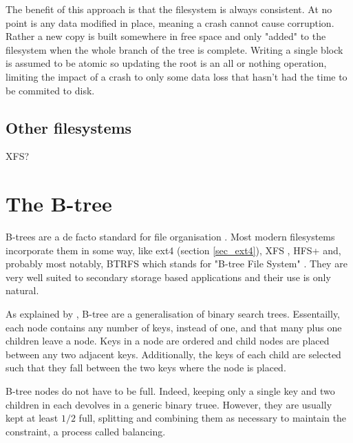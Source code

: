            The benefit of this approach is that the filesystem is always
            consistent. At no point is any data modified in place, meaning a
            crash cannot cause corruption. Rather a new copy is built somewhere
            in free space and only "added" to the filesystem when the whole
            branch of the tree is complete. Writing a single block is assumed
            to be atomic \cite{drive_atomicity} so updating the root is an all
            or nothing operation, limiting the impact of a crash to only some
            data loss that hasn't had the time to be commited to disk.


        \subsection{Other filesystems}
            XFS?

    \section{The B-tree}
        \label{sec_btree}

        B-trees are a de facto standard for file organisation
        \cite{btree_ubiquitous}. Most modern filesystems incorporate them in
        some way, like ext4 (section \ref{sec_ext4}), XFS
        \cite{XFS_scalability}, HFS+ \cite{HFSplus} and, probably most notably,
        BTRFS which stands for "B-tree File System" \cite{BTRFS}. They are very
        well suited to secondary storage based applications and their use is
        only natural.

        As explained by \citeauthor{btree_ubiquitous}, B-tree are a
        generalisation of binary search trees. Essentailly, each node contains
        any number of keys, instead of one, and that many plus one children
        leave a node. Keys in a node are ordered and child nodes are placed
        between any two adjacent keys. Additionally, the keys of each child are
        selected such that they fall between the two keys where the node is
        placed. %

        B-tree nodes do not have to be full. Indeed, keeping only a single key
        and two children in each devolves in a generic binary truee. However,
        they are usually kept at least $1/2$ full, splitting and combining them
        as necessary to maintain the constraint, a process called balancing.

